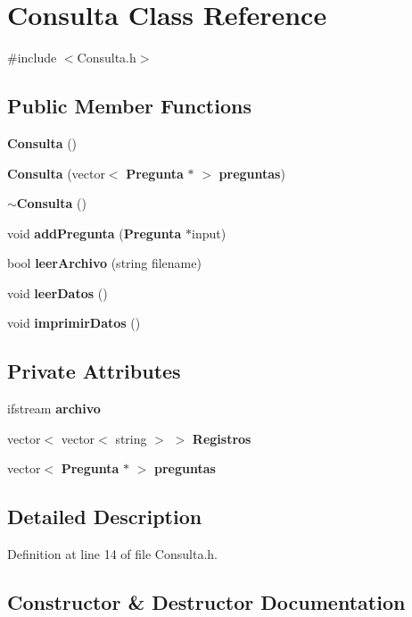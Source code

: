 \section{Consulta Class Reference}
\label{class_consulta}


{\ttfamily \#include $<$Consulta.\-h$>$}

\subsection*{Public Member Functions}
\begin{DoxyCompactItemize}
\item 
{\bf Consulta} ()
\item 
{\bf Consulta} (vector$<$ {\bf Pregunta} $\ast$ $>$ {\bf preguntas})
\item 
{\bf $\sim$\-Consulta} ()
\item 
void {\bf add\-Pregunta} ({\bf Pregunta} $\ast$input)
\item 
bool {\bf leer\-Archivo} (string filename)
\item 
void {\bf leer\-Datos} ()
\item 
void {\bf imprimir\-Datos} ()
\end{DoxyCompactItemize}
\subsection*{Private Attributes}
\begin{DoxyCompactItemize}
\item 
ifstream {\bf archivo}
\item 
vector$<$ vector$<$ string $>$ $>$ {\bf Registros}
\item 
vector$<$ {\bf Pregunta} $\ast$ $>$ {\bf preguntas}
\end{DoxyCompactItemize}


\subsection{Detailed Description}


Definition at line 14 of file Consulta.\-h.



\subsection{Constructor \& Destructor Documentation}
